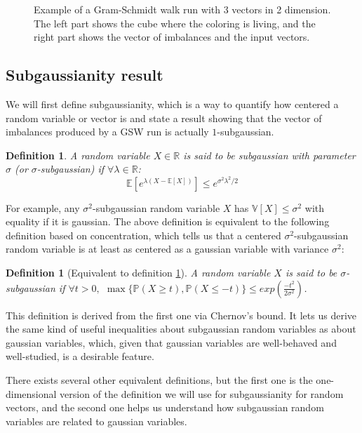 \documentclass[12pt]{article}
\newtheorem{definition}[theorem]{Definition}
\begin{document}
\begin{figure}
\centering
\newpage
{}
\caption{Example of a Gram-Schmidt walk run with 3 vectors in 2 dimension. The left part shows the cube where the coloring is living, and the right part shows the vector of imbalances and the input vectors.}
\label{3d_example}

\end{figure}


\subsection{Subgaussianity result}\label{results}
We will first define subgaussianity, which is a way to quantify how centered a random variable or vector is and state a result showing that the vector of imbalances produced by a GSW run is actually $1$-subgaussian.
\begin{definition}\label{def_subgaussianity}
A random variable $X \in \mathbb{R}$ is said to be subgaussian with parameter $\sigma$ (or $\sigma$-subgaussian) if $\forall\lambda\in\mathbb{R}$:
$$\mathbb{E}\left[e^{\lambda(X-\mathbb{E}[X])}\right]\leq e^{\sigma^2\lambda^2/2}$$
\end{definition}
For example, any $\sigma^2$-subgaussian random variable $X$ has $\mathbb{V}[X]\leq\sigma^2$ with equality if it is gaussian. The above definition is equivalent to the following definition based on concentration, which tells us that a centered $\sigma^2$-subgaussian random variable is at least as centered as a gaussian variable with variance $\sigma^2$:
\begin{definition}[Equivalent to definition \ref{def_subgaussianity}]
A random variable $X$ is said to be $\sigma$-subgaussian if $\forall t>0,$ $\max\{\mathbb{P}(X\geq t),\mathbb{P}(X\leq -t)\}\leq exp\left(\frac{-t^2}{2\sigma^2}\right)$.
\end{definition}
This definition is derived from the first one via Chernov's bound. It lets us derive the same kind of useful inequalities about subgaussian random variables as about gaussian variables, which, given that gaussian variables are well-behaved and well-studied, is a desirable feature.

There exists several other equivalent definitions, but the first one is the one-dimensional version of the definition we will use for subgaussianity for random vectors, and the second one helps us understand how subgaussian random variables are related to gaussian variables. 
\end{document}
